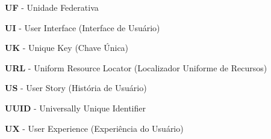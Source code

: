 \noindent \textbf{UF} - Unidade Federativa\par
\noindent \textbf{UI} - User Interface (Interface de Usuário)\par
\noindent \textbf{UK} - Unique Key (Chave Única)\par
\noindent \textbf{URL} - Uniform Resource Locator (Localizador Uniforme de Recursos)\par
\noindent \textbf{US} - User Story (História de Usuário)\par
\noindent \textbf{UUID} - Universally Unique Identifier\par
\noindent \textbf{UX} - User Experience (Experiência do Usuário)\par

